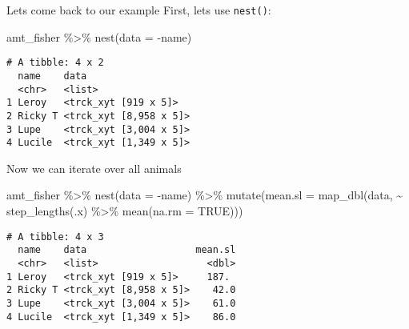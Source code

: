 \documentclass[ignorenonframetext,,t]{beamer}
\newenvironment{Shaded}{\begin{snugshade}}{\end{snugshade}}
\newcommand{\AttributeTok}[1]{\textcolor[rgb]{0.77,0.63,0.00}{#1}}
\newcommand{\ConstantTok}[1]{\textcolor[rgb]{0.00,0.00,0.00}{#1}}
\newcommand{\FunctionTok}[1]{\textcolor[rgb]{0.00,0.00,0.00}{#1}}
\newcommand{\NormalTok}[1]{#1}
\newcommand{\SpecialCharTok}[1]{\textcolor[rgb]{0.00,0.00,0.00}{#1}}
\begin{document}
\begin{frame}[fragile]
\begin{block}{Lets come back to our example}
\protect\hypertarget{lets-come-back-to-our-example}{}
First, lets use \texttt{nest()}:

\begin{Shaded}
\begin{Highlighting}[]
\NormalTok{amt\_fisher }\SpecialCharTok{\%\textgreater{}\%} \FunctionTok{nest}\NormalTok{(}\AttributeTok{data =} \SpecialCharTok{{-}}\NormalTok{name)}
\end{Highlighting}
\end{Shaded}

\begin{verbatim}
# A tibble: 4 x 2
  name    data                  
  <chr>   <list>                
1 Leroy   <trck_xyt [919 x 5]>  
2 Ricky T <trck_xyt [8,958 x 5]>
3 Lupe    <trck_xyt [3,004 x 5]>
4 Lucile  <trck_xyt [1,349 x 5]>
\end{verbatim}
\end{block}
\end{frame}

\begin{frame}[fragile]
Now we can iterate over all animals

\begin{Shaded}
\begin{Highlighting}[]
\NormalTok{amt\_fisher }\SpecialCharTok{\%\textgreater{}\%} \FunctionTok{nest}\NormalTok{(}\AttributeTok{data =} \SpecialCharTok{{-}}\NormalTok{name) }\SpecialCharTok{\%\textgreater{}\%} 
  \FunctionTok{mutate}\NormalTok{(}\AttributeTok{mean.sl =} \FunctionTok{map\_dbl}\NormalTok{(data, }\SpecialCharTok{\textasciitilde{}} \FunctionTok{step\_lengths}\NormalTok{(.x) }\SpecialCharTok{\%\textgreater{}\%} 
                             \FunctionTok{mean}\NormalTok{(}\AttributeTok{na.rm =} \ConstantTok{TRUE}\NormalTok{)))}
\end{Highlighting}
\end{Shaded}

\begin{verbatim}
# A tibble: 4 x 3
  name    data                   mean.sl
  <chr>   <list>                   <dbl>
1 Leroy   <trck_xyt [919 x 5]>     187. 
2 Ricky T <trck_xyt [8,958 x 5]>    42.0
3 Lupe    <trck_xyt [3,004 x 5]>    61.0
4 Lucile  <trck_xyt [1,349 x 5]>    86.0
\end{verbatim}
\end{frame}
\end{document}
